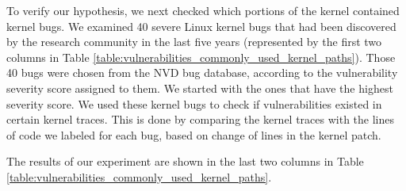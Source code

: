 To verify our hypothesis, we next checked which portions of
the kernel contained kernel bugs. We examined 40 severe Linux kernel
bugs that had been discovered by the research community in the last five
years (represented by the first two columns in Table
\ref{table:vulnerabilities_commonly_used_kernel_paths}).
Those 40 bugs were chosen from the NVD bug database, according to
the vulnerability severity score assigned to them. We started with the ones
that have the highest severity score.
We used these kernel bugs to check if vulnerabilities existed in certain
kernel traces. This is done by comparing the kernel traces with the lines
of code we labeled for each bug, based on change of lines in the
kernel patch.

The results of our experiment are shown in the last two columns in Table \ref{table:vulnerabilities_commonly_used_kernel_paths}.

